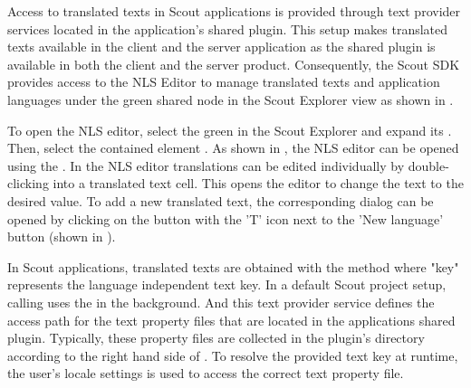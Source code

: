 \documentclass[a4paper,10pt,twoside]{book}
\begin{document}
Access to translated texts in Scout applications is provided through text provider services located in the application's shared plugin. 
This setup makes translated texts available in the client and the server application as the shared plugin is available in both the client and the server product. 
Consequently, the Scout SDK provides access to the NLS Editor to manage translated texts and application languages under the green shared node in the Scout Explorer view as shown in .

To open the NLS editor, select the green  in the Scout Explorer and expand its .
Then, select the contained element .
As shown in , the NLS editor can be opened using the .
In the NLS editor translations can be edited individually by double-clicking into a translated text cell.
This opens the editor to change the text to the desired value.
To add a new translated text, the corresponding dialog can be opened by clicking on the button with the 'T' icon next to the 'New language' button (shown in ).

In Scout applications, translated texts are obtained with the method  where "key" represents the language independent text key.
In a default Scout project setup, calling  uses the  in the background.
And this text provider service defines the access path for the text property files that are located in the applications shared plugin.
Typically, these property files are collected in the plugin's  directory according to the right hand side of . 
To resolve the provided text key at runtime, the user's locale settings is used to access the correct text property file.
\end{document}
